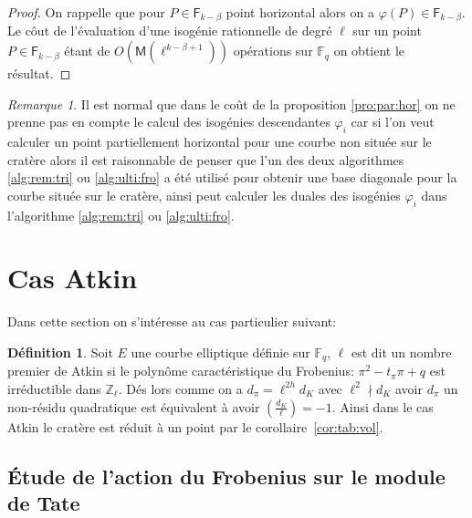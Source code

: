 \documentclass[10pt,a4paper]{book}
\theoremstyle{plain}
\theoremstyle{definition}
\theoremstyle{definition}
\theoremstyle{definition}
\theoremstyle{definition}
\newtheorem{defi}[thm]{Définition}
\theoremstyle{remark}
\newtheorem{rem}[thm]{Remarque}
\theoremstyle{remark}
\theoremstyle{definition}
\begin{document}
\begin{proof}
On rappelle que pour $P \in \mathsf{F}_{k-\beta}$ point horizontal alors on a  $\varphi(P) \in \mathsf{F}_{k-\beta}$. Le côut de l'évaluation d'une isogénie rationnelle de degré $\ell$ sur un point $P \in \mathsf{F}_{k-\beta}$ étant de $O(\mathsf{M}(\ell^{k-\beta+1}))$ opérations sur $\mathbb{F}_q$ on obtient le résultat.
\end{proof}

\begin{rem}
Il est normal que dans le coût de la proposition \ref{pro:par:hor} on ne prenne pas en compte le calcul des isogénies descendantes $\varphi_i$ car si l'on veut calculer un point partiellement horizontal pour une courbe non située sur le cratère alors il est raisonnable de penser que l'un des deux algorithmes  \ref{alg:rem:tri} ou \ref{alg:ulti:fro} a été utilisé pour obtenir une base diagonale pour la courbe située sur le cratère, ainsi peut calculer les duales des isogénies $\varphi_i$ dans l'algorithme \ref{alg:rem:tri} ou \ref{alg:ulti:fro}.
\end{rem}
\section{Cas Atkin}
\label{subs:atk:dir}
Dans cette section on s'intéresse au cas particulier suivant: 
\begin{defi}
\label{def:cas:atk}
Soit $E$ une courbe elliptique définie sur $\mathbb{F}_q$, $\ell$ est dit un 
nombre premier de Atkin si le polynôme caractéristique du Frobenius: 
$\pi^2-t_{\pi}\pi + q$ est irréductible dans $\mathbb{Z}_{\ell}$. Dés lors 
comme on a $d_{\pi}=\ell^{2h}d_{K}$ avec $\ell^2 \nmid d_{K}$ avoir 
$d_{\pi}$ un non-résidu quadratique est équivalent à avoir $\left( 
\frac{d_{K}}{\ell} \right)=-1$. Ainsi dans le cas Atkin le cratère est réduit à
un point par le corollaire~\ref{cor:tab:vol}.
\end{defi}

\subsection{\'Etude de l'action du Frobenius sur le module de Tate}
\end{document}
